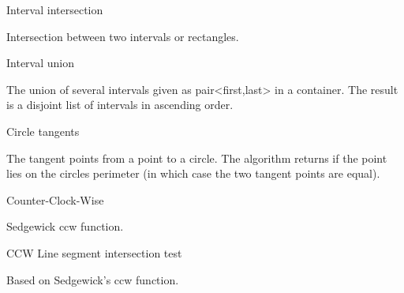 \begin{algorithm}{Interval intersection}

Intersection between two intervals or rectangles.
\end{algorithm}

\begin{algorithm}{Interval union}

The union of several intervals given as pair<first,last> in a container. The
result is a disjoint list of intervals in ascending order.
\end{algorithm}

\begin{algorithm}{Circle tangents}

The tangent points from a point to a circle. The algorithm returns if
the point lies on the circles perimeter (in which case the two tangent
points are equal).
\end{algorithm}

\begin{algorithm}{Counter-Clock-Wise}

Sedgewick ccw function.
\end{algorithm}

\begin{algorithm}{CCW Line segment intersection test}

Based on Sedgewick's ccw function.
\end{algorithm}
